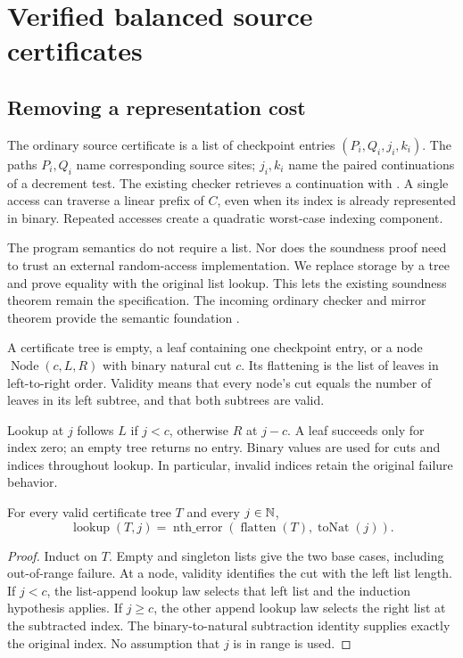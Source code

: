 \section{Verified balanced source certificates}\label{sec:balanced}

\subsection{Removing a representation cost}

The ordinary source certificate is a list of checkpoint entries
\((P_i,Q_i,j_i,k_i)\). The paths \(P_i,Q_i\) name corresponding source sites;
\(j_i,k_i\) name the paired continuations of a decrement test. The existing
checker retrieves a continuation with
. A single access can traverse a linear
prefix of \(C\), even when its index is already represented in binary.
Repeated accesses create a quadratic worst-case indexing component.

The program semantics do not require a list. Nor does the soundness proof
need to trust an external random-access implementation. We replace storage
by a tree and prove equality with the original list lookup. This lets the
existing soundness theorem remain the specification. The incoming ordinary
checker and mirror theorem provide the semantic foundation \cite{incoming}.

\begin{definition}
A certificate tree is empty, a leaf containing one checkpoint entry, or a
node \(\operatorname{Node}(c,L,R)\) with binary natural cut \(c\).
Its flattening is the list of leaves in left-to-right order. Validity means
that every node's cut equals the number of leaves in its left subtree,
and that both subtrees are valid.
\end{definition}

Lookup at \(j\) follows \(L\) if \(j<c\), otherwise \(R\) at \(j-c\).
A leaf succeeds only for index zero; an empty tree returns no entry. Binary
 values are used for cuts and indices throughout lookup. In
particular, invalid indices retain the original failure behavior.

\begin{theorem}\label{thm:lookup}
For every valid certificate tree \(T\) and every \(j\in\mathbb{N}\),
\[
 \operatorname{lookup}(T,j)=
 \operatorname{nth\_error}(\operatorname{flatten}(T),\operatorname{toNat}(j)).
\]
\end{theorem}
\begin{proof}
Induct on \(T\). Empty and singleton lists give the two base cases,
including out-of-range failure. At a node, validity identifies the cut with
the left list length. If \(j<c\), the list-append lookup law selects that
left list and the induction hypothesis applies. If \(j\ge c\), the other
append lookup law selects the right list at the subtracted index. The
binary-to-natural subtraction identity supplies exactly the original index.
No assumption that \(j\) is in range is used.
\end{proof}

